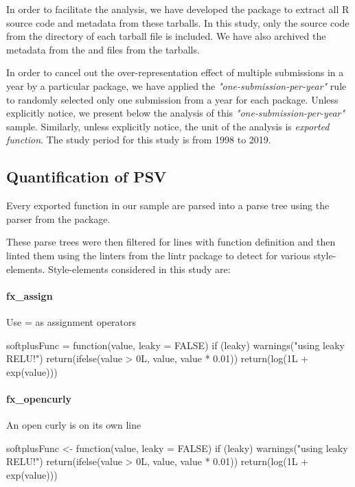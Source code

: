 In order to facilitate the analysis, we have developed the  package to extract all R source code and metadata from these tarballs. In this study, only the source code from the  directory of each tarball file is included. We have also archived the metadata from the  and  files from the tarballs.

In order to cancel out the over-representation effect of multiple submissions in a year by a particular package, we have applied the \emph{"one-submission-per-year"} rule to randomly selected only one submission from a year for each package. Unless explicitly notice, we present below the analysis of this \emph{"one-submission-per-year"} sample. Similarly, unless explicitly notice, the unit of the analysis is \emph{exported function}. The study period for this study is from 1998 to 2019.

\subsection{Quantification of PSV}

Every exported function in our sample are parsed into a parse tree using the parser from the  \citep{lintr} package.

These parse trees were then filtered for lines with function definition and then linted them using the linters from the lintr package to detect for various style-elements. Style-elements considered in this study are:

\paragraph{fx\_assign}

Use = as assignment operators

\begin{example}
softplusFunc = function(value, leaky = FALSE) {
    if (leaky) {
        warnings("using leaky RELU!")
        return(ifelse(value > 0L, value, value * 0.01))
    }
    return(log(1L + exp(value)))
}
\end{example}

\paragraph{fx\_opencurly}

An open curly is on its own line

\begin{example}
softplusFunc <- function(value, leaky = FALSE) 
{
    if (leaky) 
    {
        warnings("using leaky RELU!")
        return(ifelse(value > 0L, value, value * 0.01))
    }
    return(log(1L + exp(value)))
}
\end{example}

